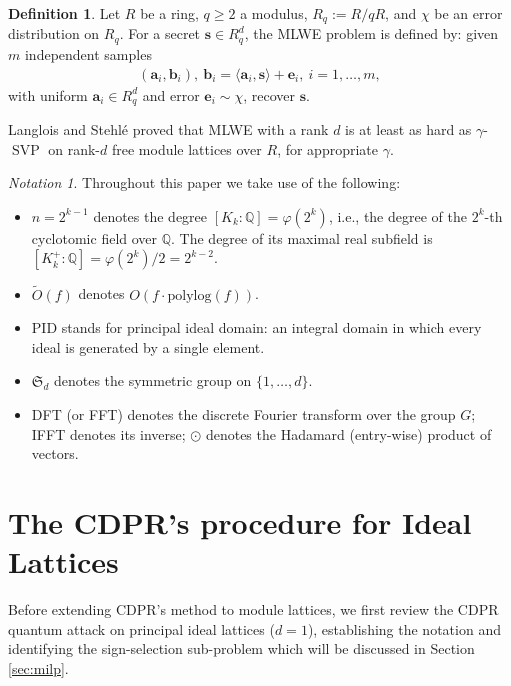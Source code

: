 \documentclass[11pt,a4paper]{article}
\theoremstyle{plain}
\theoremstyle{definition}
\newtheorem{definition}[theorem]{Definition}
\theoremstyle{remark}
\newtheorem{notation}{Notation}
\DeclareMathOperator{\SVP}{SVP}
\newcommand{\Q}{\mathbb{Q}}
\newcommand{\tO}{\tilde{O}}
\begin{document}
\begin{definition}
\label{D:MLWE}
Let $R$ be a ring, $q\ge 2$ a modulus, $R_q:= R/qR$, and $\chi$ be an error distribution on $R_q$. For a secret $\mathbf{s}\in R_q^d$, the MLWE problem \cite{LS15,ADPS16} is defined by: given $m$ independent samples
\begin{align}
(\mathbf{a}_i, \mathbf{b}_i), \ \mathbf{b}_i=\langle \mathbf{a}_i,  \mathbf{s}\rangle+\mathbf{e}_i,\ i=1, \dots, m,
\label{MLWE}
\end{align}
with uniform $\mathbf{a}_i\in R_q^d$ and error $\mathbf{e}_i \sim \chi$, recover $\mathbf{s}$.
\end{definition}

Langlois and Stehl\'{e} \cite{LS15} proved that MLWE with a rank $d$ is at least as hard as $\gamma$-$\SVP$ on rank-$d$ free module lattices over $R$, for appropriate $\gamma$.

\begin{notation}\label{not:partII}
Throughout this paper we take use of the following:
\begin{itemize}[nosep]
\item $n=2^{k-1}$ denotes the degree $[K_k:\Q]=\varphi(2^k)$, i.e., the degree of the $2^k$-th cyclotomic field over $\Q$. The degree of its maximal real subfield is $[K_k^+:\Q]=\varphi(2^k)/2=2^{k-2}$.

\item $\tO(f)$ denotes $O(f\cdot\mathrm{polylog}(f))$.

\item PID stands for principal ideal domain: an integral domain in which every ideal is generated by a single element.

\item $\mathfrak{S}_d$ denotes the symmetric group on $\{1, \dots, d\}$.

\item DFT (or FFT) denotes the discrete Fourier transform over the group $G$; IFFT denotes its inverse; $\odot$ denotes the Hadamard (entry-wise) product of vectors.
\end{itemize}

\end{notation}

\section{The CDPR's procedure for Ideal Lattices}\label{sec:cdpr}

Before extending CDPR's method to module lattices, we first review the CDPR quantum attack \cite{CDPR16} on principal ideal lattices ($d=1$), establishing the notation and identifying the sign-selection sub-problem which will be discussed in Section \ref{sec:milp}.
\end{document}

